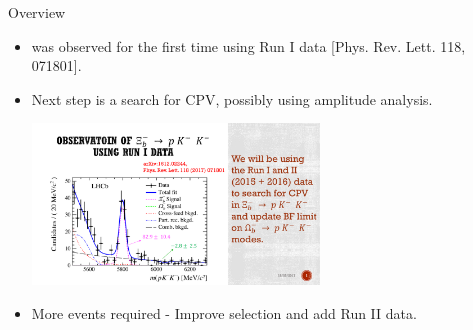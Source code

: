 \documentclass{beamer}
\begin{document}
\begin{frame}{Overview}
  \begin{itemize}
  \item {} was observed for the first time using Run I data [Phys. Rev. Lett. 118, 071801].
  \item Next step is a search for CPV, possibly using amplitude analysis.
    \begin{center}\includegraphics[width=0.6\textwidth]{XiBFit.pdf}\end{center}
  \item More events required - Improve selection and add Run II data.
  \end{itemize}
\end{frame}
\end{document}
